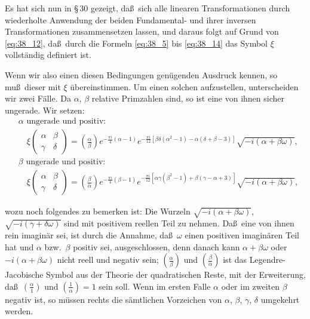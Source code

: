 \documentclass[12pt,a4paper]{article}
\begin{document}
Es hat sich nun in \S\,30 gezeigt, da\ss\ sich alle linearen Transformationen durch wiederholte Anwendung der beiden Fundamental- und ihrer inversen Transformationen zusammensetzen lassen, und daraus folgt auf Grund von \eqref{eq:38_12}, da\ss\ durch die Formeln \eqref{eq:38_5} bis \eqref{eq:38_14} das Symbol $\xi$ vollst\"andig definiert ist.

Wenn wir also einen diesen Bedingungen gen\"ugenden Ausdruck kennen, so mu\ss\ dieser mit $\xi$ \"ubereinstimmen. Um einen solchen aufzustellen, unterscheiden wir zwei F\"alle. Da $\alpha$, $\beta$ relative Primzahlen sind, so ist eine von ihnen sicher ungerade. Wir setzen:
\begin{equation}\label{eq:38_15}
\boxed{
\begin{aligned}
&\alpha\text{ ungerade und positiv:}\\
&\quad\xi\begin{pmatrix}\alpha&\beta\\\gamma&\delta\end{pmatrix}
= \left(\frac{\alpha}{\beta}\right)e^{-\frac{\pi i}{4}(\alpha-1)}e^{-\frac{\pi i}{12}[\beta\delta(\alpha^2-1)-\alpha(\delta+\beta-3)]}\sqrt{-i(\alpha+\beta\omega)},\\[6pt]
&\beta\text{ ungerade und positiv:}\\
&\quad\xi\begin{pmatrix}\alpha&\beta\\\gamma&\delta\end{pmatrix}
= \left(\frac{\beta}{\alpha}\right)e^{-\frac{\pi i}{4}(\beta-1)}e^{-\frac{\pi i}{12}[\alpha\gamma(\beta^2-1)+\beta(\gamma-\alpha+3)]}\sqrt{-i(\alpha+\beta\omega)},
\end{aligned}}
\end{equation}

\newpage
\noindent
wozu noch folgendes zu bemerken ist: Die Wurzeln $\sqrt{-i(\alpha+\beta\omega)}$, $\sqrt{-i(\gamma+\delta\omega)}$ sind mit positivem reellen Teil zu nehmen. Da\ss\ eine von ihnen rein imagin\"ar sei, ist durch die Annahme, da\ss\ $\omega$ einen positiven imagin\"aren Teil hat und $\alpha$ bzw.\ $\beta$ positiv sei, ausgeschlossen, denn danach kann $\alpha+\beta\omega$ oder $-i(\alpha+\beta\omega)$ nicht reell und negativ sein; $\left(\frac{\alpha}{\beta}\right)$ und $\left(\frac{\beta}{\alpha}\right)$ ist das Legendre-Jacobische Symbol aus der Theorie der quadratischen Reste, mit der Erweiterung, da\ss\ $\left(\frac{\alpha}{1}\right)$ und $\left(\frac{1}{\alpha}\right)=1$ sein soll. Wenn im ersten Falle $\alpha$ oder im zweiten $\beta$ negativ ist, so m\"ussen rechts die s\"amtlichen Vorzeichen von $\alpha$, $\beta$, $\gamma$, $\delta$ umgekehrt werden.
\end{document}
